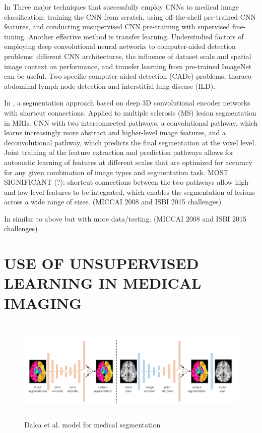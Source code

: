 \documentclass[letterpaper, 10 pt, conference]{ieeeconf}  %
\begin{document}
In \cite{hoo-chang}  Three major techniques that successfully employ CNNs to medical image classification: training the CNN from scratch, using off-the-shelf pre-trained CNN features, and conducting unsupervised CNN pre-training with supervised fine-tuning. Another effective method is transfer learning. Understudied factors of employing deep convolutional neural networks to computer-aided detection problems: different CNN architectures, the influence of dataset scale and spatial image context on performance, and transfer learning from pre-trained ImageNet can be useful. Two specific computer-aided detection (CADe) problems, thoraco-abdominal lymph node detection and interstitial lung disease (ILD).



In \cite{brosch_deep_2016}, a segmentation approach based on deep 3D convolutional encoder networks with shortcut connections. Applied to multiple sclerosis (MS) lesion segmentation in MRIs. CNN with two interconnected pathways, a convolutional pathway, which learns increasingly more abstract and higher-level image features, and a deconvolutional pathway, which predicts the final segmentation at the voxel level. Joint training of the feature extraction and prediction pathways allows for automatic learning of features at different scales that are optimized for accuracy for any given combination of image types and segmentation task. MOST SIGNIFICANT (?): shortcut connections between the two pathways allow high- and low-level features to be integrated, which enables the segmentation of lesions across a wide range of sizes. (MICCAI 2008 and ISBI 2015 challenges)

In \cite{brosch_deep_2015} similar to above but with more data/testing.  (MICCAI
2008 and ISBI 2015 challenges) 

\section{USE OF UNSUPERVISED LEARNING IN MEDICAL IMAGING}

\begin{figure}[h!]
\includegraphics[width=\textwidth,height=5cm]{dalca.png}
\caption{Dalca et al. model for medical segmentation}
\label{fig:dalca}
\end{figure}
\end{document}
